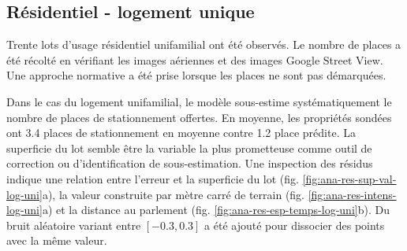 \subsection{Résidentiel - logement unique}
Trente lots d'usage résidentiel unifamilial ont été observés. Le nombre de places a été récolté en vérifiant les images aériennes et des images Google Street View. Une approche normative a été prise lorsque les places ne sont pas démarquées.\par
Dans le cas du logement unifamilial, le modèle sous-estime systématiquement le nombre de places de stationnement offertes. En moyenne, les propriétés sondées ont 3.4 places de stationnement en moyenne contre 1.2 place prédite. La superficie du lot semble être la variable la plus prometteuse comme outil de correction ou d'identification de sous-estimation. Une inspection des résidus indique une relation entre l'erreur et la superficie du lot (fig. \ref{fig:ana-res-sup-val-log-uni}a), la valeur construite par mètre carré de terrain (fig. \ref{fig:ana-res-intens-log-uni}a) et la distance au parlement (fig. \ref{fig:ana-res-esp-temps-log-uni}b). Du bruit aléatoire variant entre $[-0.3,0.3]$ a été ajouté pour dissocier des points avec la même valeur. 
